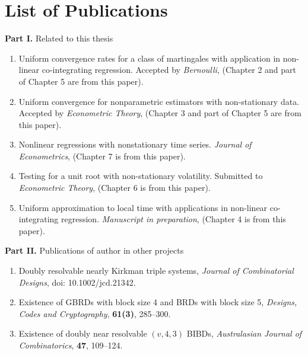 \chapter{List of Publications}

{\bf Part I.} Related to this thesis
\begin{enumerate}
\item Uniform convergence rates for a class of martingales with application in non-linear co-integrating regression. Accepted by {\it Bernoulli}, (Chapter 2 and part of Chapter 5 are from this paper).
\item Uniform convergence for nonparametric estimators with non-stationary data. Accepted by {\it Econometric Theory}, (Chapter 3 and part of Chapter 5 are from this paper).
\item Nonlinear regressions with nonstationary time series. {\it Journal of Econometrics}, (Chapter 7 is from this paper).
\item Testing for a unit root with non-stationary volatility. Submitted to {\it Econometric Theory}, (Chapter 6 is from this paper).
\item Uniform approximation to local time with applications in non-linear co-integrating regression. {\it Manuscript in preparation}, (Chapter 4 is from this paper).
\end{enumerate}

\medskip
\noindent
{\bf Part II.} Publications of author in other projects
\begin{enumerate}
\item Doubly resolvable nearly Kirkman triple systems, {\it Journal of Combinatorial Designs}, doi: 10.1002/jcd.21342.
\item Existence of GBRDs with block size 4 and BRDs with block size 5, {\it Designs, Codes and Cryptography}, {\bf 61(3)}, 285--300.
\item Existence of doubly near resolvable $(v, 4, 3)$ BIBDs, {\it Australasian Journal of Combinatorics}, {\bf 47}, 109--124.
\end{enumerate}


